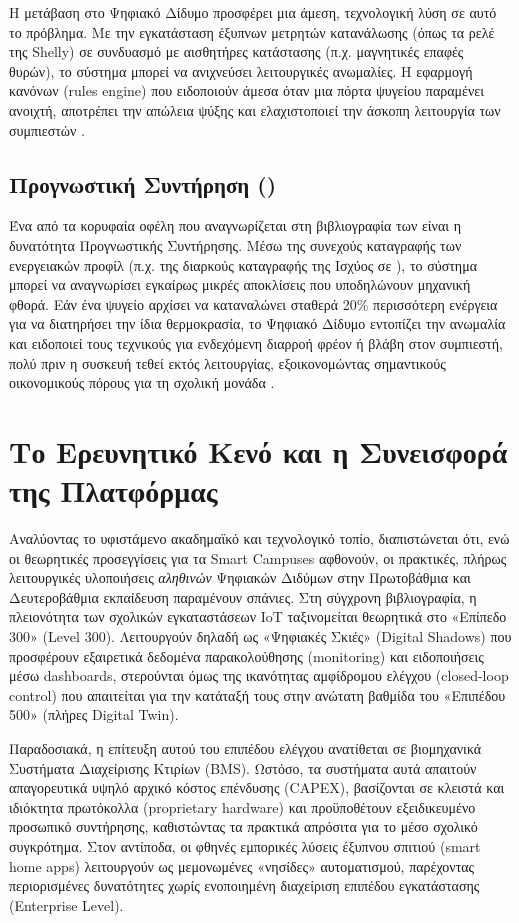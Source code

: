 Η μετάβαση στο Ψηφιακό Δίδυμο προσφέρει μια άμεση, τεχνολογική λύση σε αυτό το πρόβλημα. Με την εγκατάσταση έξυπνων μετρητών κατανάλωσης (όπως τα ρελέ της Shelly) σε συνδυασμό με αισθητήρες κατάστασης (π.χ. μαγνητικές επαφές θυρών), το σύστημα μπορεί να ανιχνεύσει λειτουργικές ανωμαλίες. Η εφαρμογή κανόνων (rules engine) που ειδοποιούν άμεσα όταν μια πόρτα ψυγείου παραμένει ανοιχτή, αποτρέπει την απώλεια ψύξης και ελαχιστοποιεί την άσκοπη λειτουργία των συμπιεστών \cite{Apostolopoulos2022, Markoska2019, Fokaides2020, Zamanidou2024}.

\subsection{Προγνωστική Συντήρηση ()}
Ένα από τα κορυφαία οφέλη που αναγνωρίζεται στη βιβλιογραφία των  είναι η δυνατότητα Προγνωστικής Συντήρησης. Μέσω της συνεχούς καταγραφής των ενεργειακών προφίλ (π.χ. της διαρκούς καταγραφής της Ισχύος σε ), το σύστημα μπορεί να αναγνωρίσει εγκαίρως μικρές αποκλίσεις που υποδηλώνουν μηχανική φθορά. Εάν ένα ψυγείο αρχίσει να καταναλώνει σταθερά 20\% περισσότερη ενέργεια για να διατηρήσει την ίδια θερμοκρασία, το Ψηφιακό Δίδυμο εντοπίζει την ανωμαλία και ειδοποιεί τους τεχνικούς για ενδεχόμενη διαρροή φρέον ή βλάβη στον συμπιεστή, πολύ πριν η συσκευή τεθεί εκτός λειτουργίας, εξοικονομώντας σημαντικούς οικονομικούς πόρους για τη σχολική μονάδα \cite{EPBD2024, Apostolopoulos2022}.

\section{Το Ερευνητικό Κενό και η Συνεισφορά της Πλατφόρμας}
Αναλύοντας το υφιστάμενο ακαδημαϊκό και τεχνολογικό τοπίο, διαπιστώνεται ότι, ενώ οι θεωρητικές προσεγγίσεις για τα Smart Campuses αφθονούν, οι πρακτικές, πλήρως λειτουργικές υλοποιήσεις \textit{αληθινών} Ψηφιακών Διδύμων στην Πρωτοβάθμια και Δευτεροβάθμια εκπαίδευση παραμένουν σπάνιες. Στη σύγχρονη βιβλιογραφία, η πλειονότητα των σχολικών εγκαταστάσεων IoT ταξινομείται θεωρητικά στο «Επίπεδο 300» (Level 300). Λειτουργούν δηλαδή ως «Ψηφιακές Σκιές» (Digital Shadows) που προσφέρουν εξαιρετικά δεδομένα παρακολούθησης (monitoring) και ειδοποιήσεις μέσω dashboards, στερούνται όμως της ικανότητας αμφίδρομου ελέγχου (closed-loop control) που απαιτείται για την κατάταξή τους στην ανώτατη βαθμίδα του «Επιπέδου 500» (πλήρες Digital Twin).

Παραδοσιακά, η επίτευξη αυτού του επιπέδου ελέγχου ανατίθεται σε βιομηχανικά Συστήματα Διαχείρισης Κτιρίων (BMS). Ωστόσο, τα συστήματα αυτά απαιτούν απαγορευτικά υψηλό αρχικό κόστος επένδυσης (CAPEX), βασίζονται σε κλειστά και ιδιόκτητα πρωτόκολλα (proprietary hardware) και προϋποθέτουν εξειδικευμένο προσωπικό συντήρησης, καθιστώντας τα πρακτικά απρόσιτα για το μέσο σχολικό συγκρότημα. Στον αντίποδα, οι φθηνές εμπορικές λύσεις έξυπνου σπιτιού (smart home apps) λειτουργούν ως μεμονωμένες «νησίδες» αυτοματισμού, παρέχοντας περιορισμένες δυνατότητες χωρίς ενοποιημένη διαχείριση επιπέδου εγκατάστασης (Enterprise Level).

